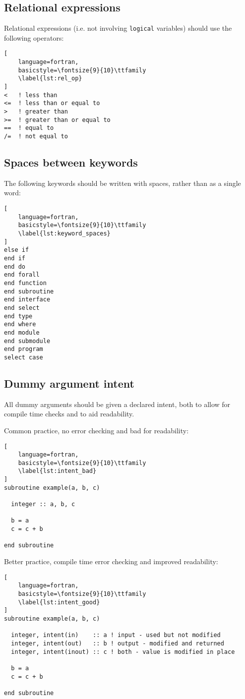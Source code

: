 \documentclass[11pt]{report}
\begin{document}
\subsection{Relational expressions}
Relational expressions (i.e. not involving \texttt{logical} variables) should use the following operators:
\begin{lstlisting}[
	language=fortran,
    basicstyle=\fontsize{9}{10}\ttfamily
    \label{lst:rel_op}
]
<   ! less than
<=  ! less than or equal to
>   ! greater than
>=  ! greater than or equal to
==  ! equal to
/=  ! not equal to
\end{lstlisting}

\subsection{Spaces between keywords}
The following keywords should be written with spaces, rather than as a single word:
\begin{lstlisting}[
	language=fortran,
    basicstyle=\fontsize{9}{10}\ttfamily
    \label{lst:keyword_spaces}
]
else if
end if
end do
end forall
end function
end subroutine
end interface
end select
end type
end where
end module
end submodule
end program
select case
\end{lstlisting}

\subsection{Dummy argument intent}
All dummy arguments should be given a declared intent, both to allow for compile time checks and to aid readability.

Common practice, no error checking and bad for readability:
\begin{lstlisting}[
	language=fortran,
    basicstyle=\fontsize{9}{10}\ttfamily
    \label{lst:intent_bad}
]
subroutine example(a, b, c)

  integer :: a, b, c

  b = a
  c = c + b

end subroutine
\end{lstlisting}

Better practice, compile time error checking and improved readability:
\begin{lstlisting}[
	language=fortran,
    basicstyle=\fontsize{9}{10}\ttfamily
    \label{lst:intent_good}
]
subroutine example(a, b, c)

  integer, intent(in)    :: a ! input - used but not modified
  integer, intent(out)   :: b ! output - modified and returned
  integer, intent(inout) :: c ! both - value is modified in place
  
  b = a
  c = c + b

end subroutine
\end{lstlisting}
\end{document}
